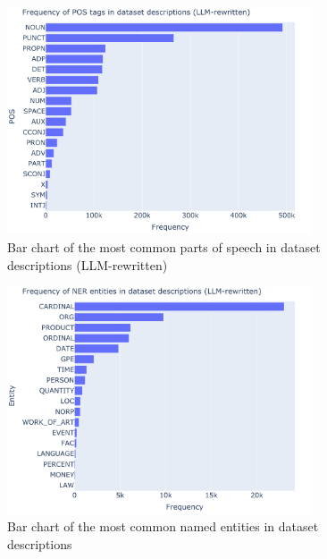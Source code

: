 \begin{figure}[h]
    \centering
    \includegraphics[width=0.8\textwidth]{figures/pos_descriptions_prompt.pdf}
    \caption{Bar chart of the most common parts of speech in dataset descriptions (LLM-rewritten)}
    \label{fig:pos_rewritten}
\end{figure}

\begin{figure}[h]
    \centering
    \includegraphics[width=0.8\textwidth]{figures/ner_descriptions_prompt.pdf}
    \caption{Bar chart of the most common named entities in dataset descriptions}
    \label{fig:ner_rewritten}
\end{figure}

